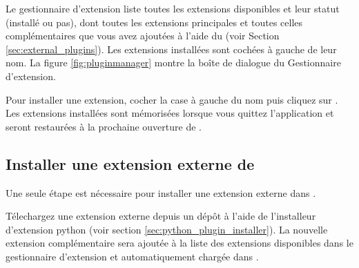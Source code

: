 Le gestionnaire d'extension liste toutes les extensions disponibles et leur statut (installé ou pas), dont toutes les extensions principales et toutes celles complémentaires que vous avez ajoutées à l'aide du  (voir Section \ref{sec:external_plugins}). Les extensions installées sont cochées à gauche de leur nom. La figure \ref{fig:pluginmanager} montre la boîte de dialogue du Gestionnaire d'extension.

Pour installer une extension, cocher la case à gauche du nom puis cliquez sur . Les extensions installées sont mémorisées lorsque vous quittez l'application et seront restaurées à la prochaine ouverture de \qg.

\subsection{Installer une extension externe de \qg}\label{sec:load_external_plugin} 

Une seule étape est nécessaire pour installer une extension externe dans \qg.

Télechargez une extension externe depuis un dépôt à l'aide de l'installeur d'extension python (voir section \ref{sec:python_plugin_installer}). La nouvelle extension complémentaire sera ajoutée à la liste des extensions disponibles dans le gestionnaire d'extension et automatiquement chargée dans \qg.

